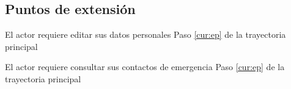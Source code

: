  
\subsection{Puntos de extensión}
\UCExtensionPoint
{El actor requiere editar sus datos personales}
{ Paso \ref{cur:ep} de la trayectoria principal}
{}

\UCExtensionPoint
{El actor requiere consultar sus contactos de emergencia}
{ Paso \ref{cur:ep} de la trayectoria principal}
{}
 

